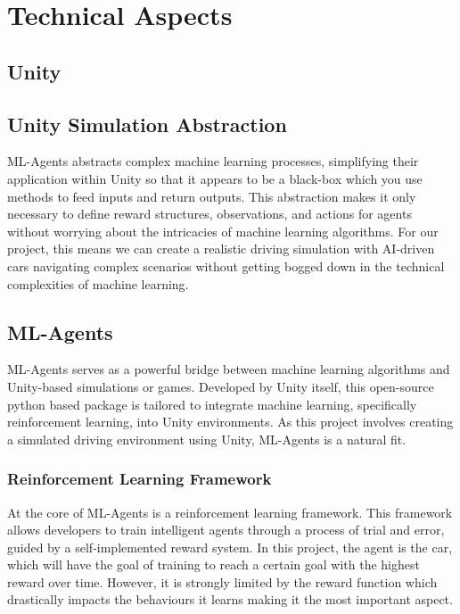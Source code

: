 \documentclass{article}
\begin{document}
\section{Technical Aspects}
\lipsum[2][1]

\subsection{Unity}

\lipsum[2][1]

\subsection{Unity Simulation Abstraction}
ML-Agents abstracts complex machine learning processes, simplifying their application within Unity so that it appears to be a black-box which you use methods to feed inputs and return outputs. This abstraction makes it only necessary to define reward structures, observations, and actions for agents without worrying about the intricacies of machine learning algorithms. For our project, this means we can create a realistic driving simulation with AI-driven cars navigating complex scenarios without getting bogged down in the technical complexities of machine learning.

\subsection{ML-Agents}
ML-Agents serves as a powerful bridge between machine learning algorithms and Unity-based simulations or games. Developed by Unity itself, this open-source python based package is tailored to integrate machine learning, specifically reinforcement learning, into Unity environments. As this project involves creating a simulated driving environment using Unity, ML-Agents is a natural fit.

\subsubsection{Reinforcement Learning Framework}
At the core of ML-Agents is a reinforcement learning framework. This framework allows developers to train intelligent agents through a process of trial and error, guided by a self-implemented reward system. In this project, the agent is the car, which will have the goal of training to reach a certain goal with the highest reward over time. However, it is strongly limited by the reward function which drastically impacts the behaviours it learns making it the most important aspect.
\end{document}
